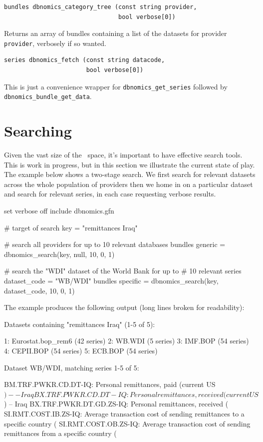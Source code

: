 \documentclass{article}
\begin{document}
\begin{funcdoc}
\begin{verbatim}
bundles dbnomics_category_tree (const string provider,
                                bool verbose[0])
\end{verbatim}
  Returns an array of bundles containing a list of the datasets for
  provider \texttt{provider}, verbosely if so wanted.
\end{funcdoc}

\begin{funcdoc}
\begin{verbatim}
series dbnomics_fetch (const string datacode,
                       bool verbose[0])
\end{verbatim}
  This is just a convenience wrapper for
  \texttt{dbnomics\_get\_series} followed by
  \texttt{dbnomics\_bundle\_get\_data}.
\end{funcdoc}

\section{Searching \DB}
\label{sec:search}

Given the vast size of the \DB\ space, it's important to
have effective search tools. This is work in progress, but in this
section we illustrate the current state of play. The example below
shows a two-stage search. We first search for relevant datasets across
the whole population of providers then we home in on a particular
dataset and search for relevant series, in each case requesting
verbose results.

\begin{code}
set verbose off
include dbnomics.gfn

# target of search
key = "remittances Iraq"

# search all providers for up to 10 relevant databases
bundles generic = dbnomics_search(key, null, 10, 0, 1)

# search the "WDI" dataset of the World Bank for up to
# 10 relevant series
dataset_code = "WB/WDI"
bundles specific = dbnomics_search(key, dataset_code, 10, 0, 1)
\end{code}

The example produces the following output (long lines broken for
readability):

\begin{code}
Datasets containing "remittances Iraq" (1-5 of 5):

  1: Eurostat.bop_rem6 (42 series)
  2: WB.WDI (5 series)
  3: IMF.BOP (54 series)
  4: CEPII.BOP (54 series)
  5: ECB.BOP (54 series)

Dataset WB/WDI, matching series 1-5 of 5:

BM.TRF.PWKR.CD.DT-IQ: Personal remittances, paid (current US$) -- Iraq
BX.TRF.PWKR.CD.DT-IQ: Personal remittances, received (current US$) -- Iraq
BX.TRF.PWKR.DT.GD.ZS-IQ: Personal remittances, received (%
SI.RMT.COST.IB.ZS-IQ: Average transaction cost of sending remittances
  to a specific country (%
SI.RMT.COST.OB.ZS-IQ: Average transaction cost of sending remittances
  from a specific country (%
\end{code}
\end{document}
